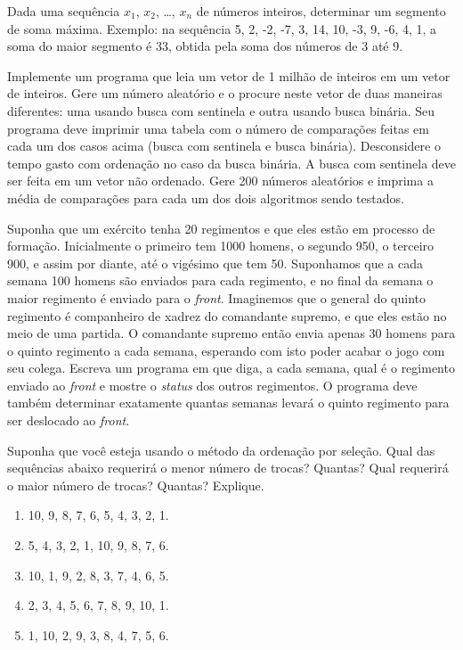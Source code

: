 \item Dada  uma  sequência  $x_1$,  $x_2$, \ldots,  $x_n$  de  
números  inteiros,
determinar um segmento de soma  máxima.  Exemplo: na sequência 5, 2, -2,
-7, 3, 14,  10, -3, 9, -6, 4,  1, a soma do maior segmento  é 33, obtida
pela soma dos números de 3 até 9. 
 
\item Implemente um programa que leia um vetor de 1 milhão de inteiros
   em um vetor de inteiros. Gere um número aleatório e o procure
   neste vetor de duas maneiras diferentes: uma usando busca com 
   sentinela e outra usando busca binária. Seu programa deve imprimir
   uma tabela com o número de comparações feitas em cada um dos casos
   acima (busca com sentinela e busca binária). Desconsidere o tempo
   gasto com ordenação no caso da busca binária. A busca com sentinela
   deve ser feita em um vetor não ordenado. Gere 200 números aleatórios
   e imprima a média de comparações para cada um dos dois algoritmos
   sendo testados.

\item 
Suponha que um ex\'ercito tenha 20 regimentos e que eles est\~ao em processo
de forma\c c\~ao. Inicialmente o primeiro tem 1000 homens, o segundo 950,
o terceiro 900, e assim por diante, at\'e o vig\'esimo que tem 50. Suponhamos
que a cada semana 100 homens s\~ao enviados para cada regimento, e no final
da semana o maior regimento \'e enviado para o {\em front}. Imaginemos que o
general do quinto regimento \'e companheiro de xadrez do comandante supremo,
e que eles est\~ao no meio de uma partida. O comandante supremo ent\~ao
envia apenas 30 homens para o quinto regimento a cada semana, esperando com
isto poder acabar o jogo com seu colega.
Escreva um programa em 
que diga, a cada semana, qual \'e o regimento enviado ao {\em front} e mostre o {\em status} dos outros regimentos. O programa
deve tamb\'em determinar exatamente quantas semanas levar\'a o quinto regimento
para ser deslocado ao {\em front}. 

\item Suponha que voc\^e esteja usando o m\'etodo da ordenação 
por sele\c c\~ao. Qual das sequências abaixo requerir\'a o menor n\'umero
de trocas? Quantas? Qual requerir\'a o maior n\'umero de trocas? Quantas?
Explique.
\begin {enumerate}
\item 10, 9, 8, 7, 6, 5, 4, 3, 2, 1.
\item 5, 4, 3, 2, 1, 10, 9, 8, 7, 6.
\item 10, 1, 9, 2, 8, 3, 7, 4, 6, 5.
\item 2, 3, 4, 5, 6, 7, 8, 9, 10, 1.
\item 1, 10, 2, 9, 3, 8, 4, 7, 5, 6.
\end {enumerate}

